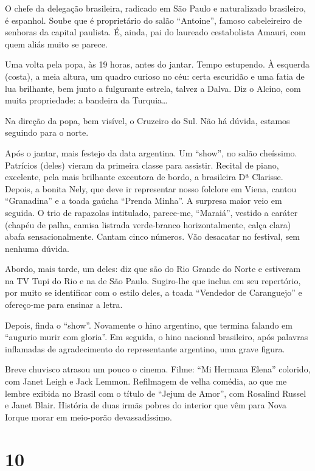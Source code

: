 O chefe da delegação brasileira, radicado em São Paulo e naturalizado brasileiro, é espanhol. Soube que é proprietário do salão “Antoine”, famoso cabeleireiro de senhoras da capital paulista. É, ainda, pai do laureado cestabolista Amauri, com quem aliás muito se parece.

Uma volta pela popa, às 19 horas, antes do jantar. Tempo estupendo. À esquerda (costa), a meia altura, um quadro curioso no céu: certa escuridão e uma fatia de lua brilhante, bem junto a fulgurante estrela, talvez a Dalva. Diz o Alcino, com muita propriedade: a bandeira da Turquia\ldots

Na direção da popa, bem visível, o Cruzeiro do Sul. Não há dúvida, estamos seguindo para o norte.

Após o jantar, mais festejo da data argentina. Um “show”, no salão cheíssimo. Patrícios (deles) vieram da primeira classe para assistir. Recital de piano, excelente, pela mais brilhante executora de bordo, a brasileira Dª Clarisse. Depois, a bonita Nely, que deve ir representar nosso folclore em Viena, cantou “Granadina” e a toada gaúcha “Prenda Minha”. A surpresa maior veio em seguida. O trio de rapazolas intitulado, parece-me, “Maraiá”, vestido a caráter (chapéu de palha, camisa listrada verde-branco horizontalmente, calça clara) abafa sensacionalmente. Cantam cinco números. Vão desacatar no festival, sem nenhuma dúvida.

Abordo, mais tarde, um deles: diz que são do Rio Grande do Norte e estiveram na TV Tupi do Rio e na de São Paulo. Sugiro-lhe que inclua em seu repertório, por muito se identificar com o estilo deles, a toada “Vendedor de Caranguejo” e ofereço-me para ensinar a letra.

Depois, finda o “show”. Novamente o hino argentino, que termina falando em “augurio murir com gloria”. Em seguida, o hino nacional brasileiro, após palavras inflamadas de agradecimento do representante argentino, uma grave figura.

Breve chuvisco atrasou um pouco o cinema. Filme: “Mi Hermana Elena” colorido, com Janet Leigh e Jack Lemmon. Refilmagem de velha comédia, ao que me lembre exibida no Brasil com o título de “Jejum de Amor”, com Rosalind Russel e Janet Blair. História de duas irmãs pobres do interior que vêm para Nova Iorque morar em meio-porão devassadíssimo.

\section*{10 \adfflatleafright {}}

